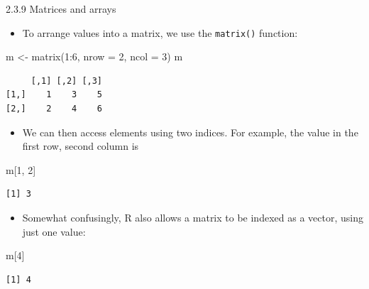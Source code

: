 \documentclass[
  9pt,
  a4paper,
  ignorenonframetext,
  notheorems]{beamer}
\newenvironment{Shaded}{\begin{snugshade}}{\end{snugshade}}
\newcommand{\AttributeTok}[1]{\textcolor[rgb]{0.40,0.45,0.13}{#1}}
\newcommand{\DecValTok}[1]{\textcolor[rgb]{0.68,0.00,0.00}{#1}}
\newcommand{\FunctionTok}[1]{\textcolor[rgb]{0.28,0.35,0.67}{#1}}
\newcommand{\NormalTok}[1]{\textcolor[rgb]{0.00,0.23,0.31}{#1}}
\newcommand{\OtherTok}[1]{\textcolor[rgb]{0.00,0.23,0.31}{#1}}
\newcommand{\SpecialCharTok}[1]{\textcolor[rgb]{0.37,0.37,0.37}{#1}}
\providecommand{\tightlist}{%
  \setlength{\itemsep}{0pt}\setlength{\parskip}{0pt}}\usepackage{longtable,booktabs,array}
\begin{document}
\begin{frame}[fragile]{2.3.9 Matrices and arrays}
\protect\hypertarget{matrices-and-arrays}{}
\begin{itemize}
\tightlist
\item
  To arrange values into a matrix, we use the \texttt{matrix()}
  function:
\end{itemize}

\begin{Shaded}
\begin{Highlighting}[]
\NormalTok{m }\OtherTok{\textless{}{-}} \FunctionTok{matrix}\NormalTok{(}\DecValTok{1}\SpecialCharTok{:}\DecValTok{6}\NormalTok{, }\AttributeTok{nrow =} \DecValTok{2}\NormalTok{, }\AttributeTok{ncol =} \DecValTok{3}\NormalTok{) }
\NormalTok{m}
\end{Highlighting}
\end{Shaded}

\begin{verbatim}
     [,1] [,2] [,3]
[1,]    1    3    5
[2,]    2    4    6
\end{verbatim}

\begin{itemize}
\tightlist
\item
  We can then access elements using two indices. For example, the value
  in the first row, second column is
\end{itemize}

\begin{Shaded}
\begin{Highlighting}[]
\NormalTok{m[}\DecValTok{1}\NormalTok{, }\DecValTok{2}\NormalTok{]}
\end{Highlighting}
\end{Shaded}

\begin{verbatim}
[1] 3
\end{verbatim}

\begin{itemize}
\tightlist
\item
  Somewhat confusingly, R also allows a matrix to be indexed as a
  vector, using just one value:
\end{itemize}

\begin{Shaded}
\begin{Highlighting}[]
\NormalTok{m[}\DecValTok{4}\NormalTok{]}
\end{Highlighting}
\end{Shaded}

\begin{verbatim}
[1] 4
\end{verbatim}
\end{frame}
\end{document}
